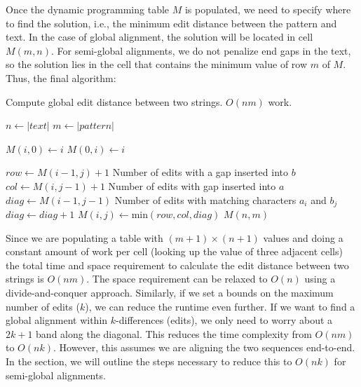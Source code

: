 Once the dynamic programming table $M$ is populated, we need to specify where to find the solution, i.e., the minimum edit distance between the pattern and text.
In the case of global alignment, the solution will be located in cell $M(m,n)$.
For semi-global alignments, we do not penalize end gaps in the text, so the solution lies in the cell that contains the minimum value of row $m$ of $M$. Thus, the final algorithm:

 \begin{algorithm}
 \caption{Compute global edit distance between two strings. $O(nm)$ work.}\label{edit_distance}
 \begin{algorithmic}[1]
 \State $n\gets |text|$
 \State $m\gets |pattern|$

    \State $M(i,0) \gets i$ \EndFor
  \State $M(0,i) \gets i$
\EndFor

  \State $row \gets M(i-1,j) + 1$ \Comment Number of edits with a gap inserted into $b$
  \State $col \gets M(i,j-1) + 1$ \Comment Number of edits with gap inserted into $a$
  \State $diag \gets M(i-1, j-1)$ \Comment Number of edits with matching characters $a_i$ and $b_j$
    $diag \gets diag +  1$ \EndIf
  \State $M(i,j) \gets \text{min}(row,col,diag)$
\EndFor
\EndFor
\Return $M(n,m)$
\EndProcedure
\end{algorithmic}
\end{algorithm}

Since we are populating a table with $(m+1) \times (n+1)$ values and doing a constant amount of work per cell (looking up the value of three adjacent cells) the total time and space requirement to calculate the edit distance between two strings is $O(nm)$.
The space requirement can be relaxed to $O(n)$ using a divide-and-conquer approach\cite{gusfield_algorithms_1997}.
Similarly, if we set a bounds on the maximum number of edits ($k$), we can reduce the runtime even further.
If we want to find a global alignment within $k$-differences (edits), we only need to worry about a $2k+1$ band along the diagonal.
This reduces the time complexity from $O(nm)$ to $O(nk)$.
However, this assumes we are aligning the two sequences end-to-end.
In the section, we will outline the steps necessary to reduce this to $O(nk)$ for semi-global alignments.



